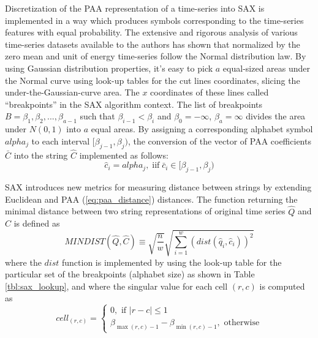 \documentclass[conference]{worldcomp}
\begin{document}
Discretization of the PAA representation of a time-series into SAX is implemented in a way which produces 
symbols corresponding to the time-series features with equal probability. The extensive and rigorous 
analysis of various time-series datasets available to the authors has shown that normalized by the zero 
mean and unit of energy time-series follow the Normal distribution law. By using Gaussian distribution 
properties, it's easy to pick $a$ equal-sized areas under the Normal curve using  look-up tables \cite{citeulike:4434481} 
for the cut lines coordinates, slicing the under-the-Gaussian-curve area. 
The $x$ coordinates of these lines called ``breakpoints'' in the SAX algorithm context. The 
list of breakpoints $B=\beta_{1}, \beta_{2}, ... , \beta_{a-1}$ such that 
$\beta_{i-1} < \beta_{i}$ and $\beta_{0} = -\infty$, $\beta_{a} = \infty$ 
divides the area under $N(0,1)$ into $a$ equal areas. 
By assigning a corresponding alphabet symbol $alpha_{j}$ to each interval $[\beta_{j-1},\beta_{j})$, 
the conversion of the vector of PAA coefficients $\bar{C}$ into the string $\hat{C}$ implemented as follows:
\begin{equation}
\hat{c}_{i} = alpha_{j}, \; \text{iif} \; \bar{c}_{i} \in [\beta_{j-1},\beta_{j})
\label{eq:alpha}
\end{equation}


SAX introduces new metrics for measuring distance between strings by extending Euclidean and PAA (\ref{eq:paa_distance}) distances. 
The function returning the minimal distance between two string representations of original
 time series $\hat{Q}$ and $\hat{C}$ is defined as
\begin{equation}
MINDIST(\hat{Q},\hat{C}) \equiv \sqrt{ \frac{n}{w} } \sqrt{ \sum_{i=1}^{w} ( dist( \hat{q}_{i}, \hat{c}_{i} ) )^{2}}
\label{eq:sax_mindist}
\end{equation} 
where the $dist$ function is implemented by using the look-up table for the particular set of the breakpoints 
(alphabet size) as shown in Table \ref{tbl:sax_lookup}, and where the singular value for each cell $(r,c)$ 
is computed as 
\begin{equation}
cell_{(r,c)} = 
\begin{cases} 
0, \text{ if }\left| r-c \right| \leq 1 \\
\beta_{\max(r,c) - 1} - \beta_{\min(r,c) - 1}, \text{ otherwise}
\end{cases}
\label{eq:cell}
\end{equation}
\end{document}
